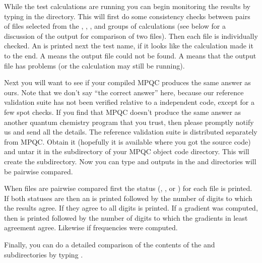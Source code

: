   While the test calculations are running you can begin monitoring the
results by typing  in the 
directory.  This will first do some consistency checks between pairs of
files selected from the , , , and
 groups of calculations (see below for a discussion of the
output for comparison of two files).  Then each file is individually
checked.  An  is printed next the test name, if it looks like the
calculation made it to the end.  A  means the output file
could not be found.  A  means that the output file has
problems (or the calculation may still be running).

  Next you will want to see if your compiled MPQC produces the same answer
as ours.  Note that we don't say ``the correct answer'' here, because our
reference validation suite has not been verified relative to a independent
code, except for a few spot checks.  If you find that MPQC doesn't produce
the same answer as another quantum chemistry program that you trust, then
please promptly notify us and send all the details.  The reference
validation suite is distributed separately from MPQC.  Obtain it (hopefully
it is available where you got the source code) and untar it in the
 subdirectory of your MPQC object code
directory.  This will create the  subdirectory.  Now you can
type  and outputs in the  and 
directories will be pairwise compared.

  When files are pairwise compared first the status (,
, or ) for each file is printed.  If both
statuses are  then an  is printed followed by the number
of digits to which the results agree.  If they agree to all digits
 is printed.  If a gradient was computed, then  is
printed followed by the number of digits to which the gradients in least
agreement agree.  Likewise if frequencies were computed.

  Finally, you can do a detailed comparison of the contents of the
 and  subdirectories by typing .

